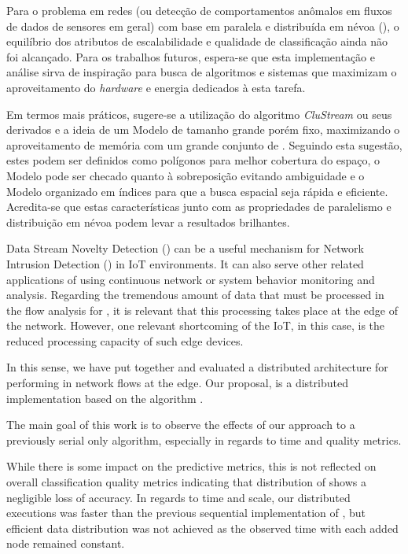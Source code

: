 Para o problema \nids em redes \iot
(ou detecção de comportamentos anômalos em fluxos de dados de sensores \iot em geral)
com base em \nd paralela e distribuída em névoa (\fog),
o equilíbrio dos atributos de escalabilidade e qualidade de classificação ainda não foi alcançado.
Para os trabalhos futuros, espera-se que esta implementação e análise sirva de inspiração
para busca de algoritmos e sistemas que maximizam o aproveitamento do \emph{hardware} e energia
dedicados à esta tarefa.

Em termos mais práticos, sugere-se a utilização do algoritmo \emph{CluStream} \cite{Aggarwal2003}
ou seus derivados e a ideia de um Modelo de tamanho grande porém fixo, maximizando 
o aproveitamento de memória com um grande conjunto de \mclusters.
Seguindo esta sugestão, estes \mclusters podem ser definidos como polígonos para 
melhor cobertura do espaço, o Modelo pode ser checado quanto à sobreposição evitando ambiguidade e
o Modelo organizado em índices para que a busca espacial seja rápida e eficiente.
Acredita-se que estas características junto com as propriedades de paralelismo e distribuição
em névoa podem levar a resultados brilhantes.

Data Stream Novelty Detection (\nd) can be a useful mechanism for Network
Intrusion Detection (\nids) in IoT environments.
It can also serve other related applications of \nd using continuous network or
system behavior monitoring and analysis.
Regarding the tremendous amount of data that must be processed in the flow
analysis for \nd, it is relevant that this processing takes place at the edge of
the network.
However, one relevant shortcoming of the IoT, in this case, is the reduced
processing capacity of such edge devices.

In this sense, we have put together and evaluated a distributed architecture for
performing \nd in network flows at the edge.
Our proposal, \mfog is a distributed \nd implementation based on the \nd
algorithm \minas.

The main goal of this work is to observe the effects of our approach to a
previously serial only algorithm, especially in regards to time and quality
metrics.

While there is some impact on the predictive metrics, this is not reflected on
overall classification quality metrics indicating that distribution of \minas
shows a negligible loss of accuracy.
In regards to time and scale, our distributed executions was faster than the
previous sequential implementation of \minas, but efficient data distribution
was not achieved as the observed time with each added node remained constant.

